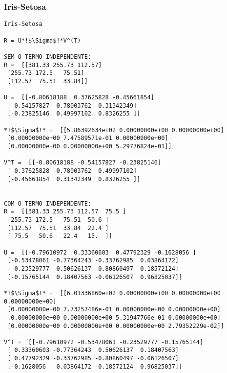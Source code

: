 \documentclass[a4paper,12pt,twoside]{article}
\begin{document}
\subsubsection{Iris-Setosa}
\begin{lstlisting}
Iris-Setosa

R = U*!$\Sigma$!*V^(T)

SEM O TERMO INDEPENDENTE: 
R =  [[381.33 255.73 112.57]
 [255.73 172.5   75.51]
 [112.57  75.51  33.84]]

U =  [[-0.80618188  0.37625828 -0.45661854]
 [-0.54157827 -0.78003762  0.31342349]
 [-0.23825146  0.49997102  0.8326255 ]]

*!$\Sigma$!* =  [[5.86392634e+02 0.00000000e+00 0.00000000e+00]
 [0.00000000e+00 7.47589571e-01 0.00000000e+00]
 [0.00000000e+00 0.00000000e+00 5.29776824e-01]]

V^T =  [[-0.80618188 -0.54157827 -0.23825146]
 [ 0.37625828 -0.78003762  0.49997102]
 [-0.45661854  0.31342349  0.8326255 ]]


COM O TERMO INDEPENDENTE: 
R =  [[381.33 255.73 112.57  75.5 ]
 [255.73 172.5   75.51  50.6 ]
 [112.57  75.51  33.84  22.4 ]
 [ 75.5   50.6   22.4   15.  ]]

U =  [[-0.79610972  0.33360603  0.47792329 -0.1628056 ]
 [-0.53478061 -0.77364243 -0.33762985  0.03864172]
 [-0.23529777  0.50626137 -0.80860497 -0.18572124]
 [-0.15765144  0.18407563 -0.06126507  0.96825037]]

*!$\Sigma$!* =  [[6.01336860e+02 0.00000000e+00 0.00000000e+00 0.00000000e+00]
 [0.00000000e+00 7.73257486e-01 0.00000000e+00 0.00000000e+00]
 [0.00000000e+00 0.00000000e+00 5.31947766e-01 0.00000000e+00]
 [0.00000000e+00 0.00000000e+00 0.00000000e+00 2.79352229e-02]]

V^T =  [[-0.79610972 -0.53478061 -0.23529777 -0.15765144]
 [ 0.33360603 -0.77364243  0.50626137  0.18407563]
 [ 0.47792329 -0.33762985 -0.80860497 -0.06126507]
 [-0.1628056   0.03864172 -0.18572124  0.96825037]]
\end{lstlisting}
\end{document}
